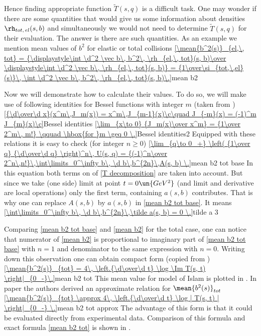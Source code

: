 Hence finding appropriate function $\tilde T(s, q)$ is a difficult task. One may wonder if there are some quantities that would give us some information about densities $\rh_{tot,\, el}(s, b)$ and simultaneously we would not need to determine $\tilde T(s, q)$ for their evaluation. The answer is there are such quantities. As an example we mention mean values of $b^2$ for elastic or total collisions
\eqref{\mean{b^2(s)}_{el,\, tot} = {\displaystyle\int \d^2 \vec b\, b^2\, \rh_{el,\, tot}(s, b)\over \displaystyle\int \d^2 \vec b\, \rh_{el,\, tot}(s, b)} = {1\over\si_{tot,\,el}(s)}\, \int \d^2 \vec b\, b^2\, \rh_{el,\, tot}(s, b)\.}{mean b2}

Now we will demonstrate how to calculate their values. To do so, we will make use of following identities for Bessel functions with integer $m$ (taken from )
\eqref{{\d\over\d x}(x^m\,J_m(x)) = x^m\,J_{m-1}(x)\c\quad J_{-m}(x) = (-1)^m J_{m}(x)\c}{Bessel identities}
\eqref{\lim_{x\to 0} {J_m(x)\over x^m} = {1\over 2^m\, m!} \qquad \hbox{for }m \geq 0 \.}{Bessel identities2}
Equipped with these relations it is easy to check (for integer $n \geq 0$)
\eqref{\lim_{q\to 0_+} \left( {1\over q} {\d\over\d q} \right)^n\, U(s, q) = {(-1)^n\over 2^n\,n!}\,\int\limits_0^\infty b\, \d b\,b^{2n}\,A(s, b) \.}{mean b2 tot base}
In this equation both terms on \rhs{} of \ref{T decomposition} are taken into account. But since we take (one side) limit at point $t = 0\un{GeV^2}$ (and limit and derivative are local operations) only the first term, containing $a(s, b)$ contributes. That is why one can replace $A(s, b)$ by $a(s, b)$ in \equ{} \ref{mean b2 tot base}. It means
\eqref{\int\limits_0^\infty b\, \d b\,b^{2n}\,\tilde a(s, b) = 0 \.}{tilde a 3}

Comparing \equs{} \ref{mean b2 tot base} and \ref{mean b2} for the total case, one can notice that numerator of \equ{} \ref{mean b2} is proportional to imaginary part of \ref{mean b2 tot base} with $n = 1$ and denominator to the same expression with $n = 0$. Writing down this observation one can obtain compact form (copied from )
\eqref{\mean{b^2(s)}_{tot} = 4\, \left.{\d\over\d t} \log \Im T(s, t) \right|_{0_-}\.}{mean b2 tot}
This mean value for model of Islam is plotted in \fg{} . In paper  the authors derived an approximate relation for $\mean{b^2(s)}_{tot}$
\eqref{\mean{b^2(s)}_{tot} \approx 4\, \left.{\d\over\d t} \log | T(s, t) | \right|_{0_-} \.}{mean b2 tot approx}
The advantage of this form is that it could be evaluated directly from experimental data. Comparison of this formula and exact formula \ref{mean b2 tot} is shown in \fg{} .

